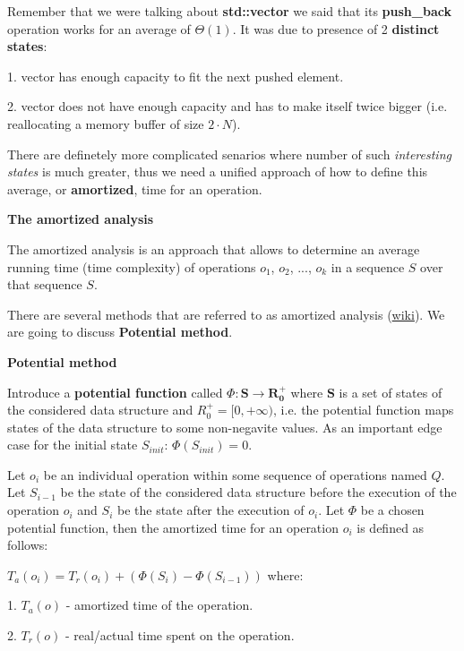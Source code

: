 
Remember that we were talking about \textbf{std::vector} we said that its \textbf{push\_back} operation works for an average of $\Theta(1)$. It was due to presence of 2 \textbf{distinct states}:

1. vector has enough capacity to fit the next pushed element.

2. vector does not have enough capacity and has to make itself twice bigger (i.e. reallocating a memory buffer of size $2\cdot N$).

There are definetely more complicated senarios where number of such \textit{interesting states} is much greater, thus we need a unified approach of how to define this average, or \textbf{amortized}, time for an operation.

\begin{definition}
    \textbf{The amortized analysis}

    The amortized analysis is an approach that allows to determine an average running time (time complexity) of operations $o_1$, $o_2$, ..., $o_k$ in a sequence $S$ over that sequence $S$.

\end{definition}

There are several methods that are referred to as amortized analysis (\href{https://en.wikipedia.org/wiki/Amortized_analysis}{wiki}). We are going to discuss \textbf{Potential method}.


\begin{definition}
    \textbf{Potential method}


    Introduce a \textbf{potential function} called $\Phi: \mathbf{S} \to \mathbf{R_{0}^{+}}$ where $\mathbf{S}$ is a set of states of the considered data structure and $R_{0}^{+} = [0, +\infty)$, i.e. the potential function maps states of the data structure to some non-negavite values. As an important edge case for the initial state $S_{init}$: $\Phi(S_{init}) = 0$.

    Let $o_i$ be an individual operation within some sequence of operations named $Q$. Let $S_{i-1}$ be the state of the considered data structure before the execution of the operation $o_i$ and $S_{i}$ be the state after the execution of $o_i$. Let $\Phi$ be a chosen potential function, then the amortized time for an operation $o_i$ is defined as follows:

    $ T_{a}(o_i) = T_{r}(o_i) + \left (\Phi(S_{i}) - \Phi(S_{i-1}) \right ) $ where:

    1. $T_{a}(o)$ - amortized time of the operation.

    2. $T_{r}(o)$ - real/actual time spent on the operation.
\end{definition}

